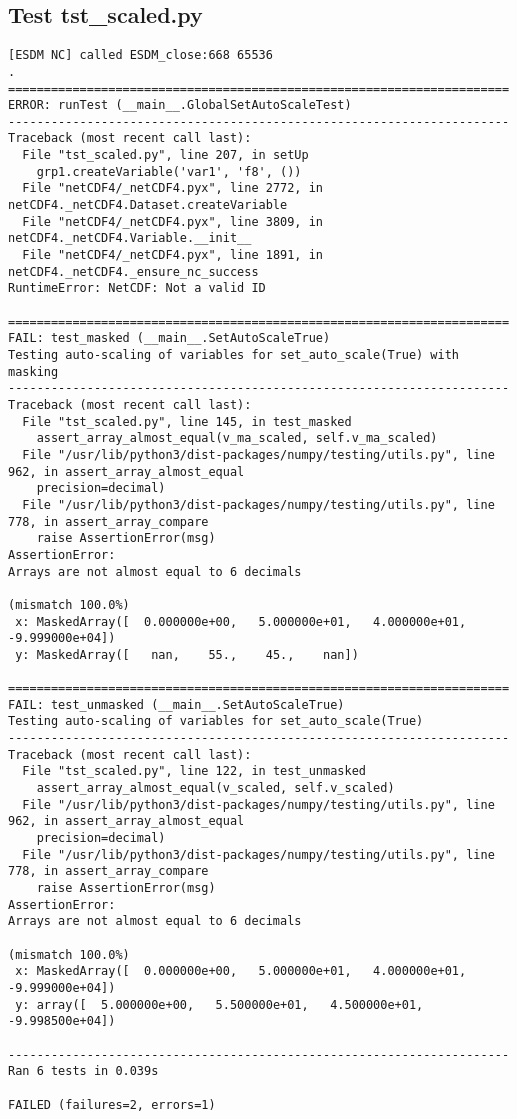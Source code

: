 \subsection{Test tst\_scaled.py}

\begin{verbatim}
[ESDM NC] called ESDM_close:668 65536
.
======================================================================
ERROR: runTest (__main__.GlobalSetAutoScaleTest)
----------------------------------------------------------------------
Traceback (most recent call last):
  File "tst_scaled.py", line 207, in setUp
    grp1.createVariable('var1', 'f8', ())
  File "netCDF4/_netCDF4.pyx", line 2772, in netCDF4._netCDF4.Dataset.createVariable
  File "netCDF4/_netCDF4.pyx", line 3809, in netCDF4._netCDF4.Variable.__init__
  File "netCDF4/_netCDF4.pyx", line 1891, in netCDF4._netCDF4._ensure_nc_success
RuntimeError: NetCDF: Not a valid ID

======================================================================
FAIL: test_masked (__main__.SetAutoScaleTrue)
Testing auto-scaling of variables for set_auto_scale(True) with masking
----------------------------------------------------------------------
Traceback (most recent call last):
  File "tst_scaled.py", line 145, in test_masked
    assert_array_almost_equal(v_ma_scaled, self.v_ma_scaled)
  File "/usr/lib/python3/dist-packages/numpy/testing/utils.py", line 962, in assert_array_almost_equal
    precision=decimal)
  File "/usr/lib/python3/dist-packages/numpy/testing/utils.py", line 778, in assert_array_compare
    raise AssertionError(msg)
AssertionError:
Arrays are not almost equal to 6 decimals

(mismatch 100.0%)
 x: MaskedArray([  0.000000e+00,   5.000000e+01,   4.000000e+01,  -9.999000e+04])
 y: MaskedArray([   nan,    55.,    45.,    nan])

======================================================================
FAIL: test_unmasked (__main__.SetAutoScaleTrue)
Testing auto-scaling of variables for set_auto_scale(True)
----------------------------------------------------------------------
Traceback (most recent call last):
  File "tst_scaled.py", line 122, in test_unmasked
    assert_array_almost_equal(v_scaled, self.v_scaled)
  File "/usr/lib/python3/dist-packages/numpy/testing/utils.py", line 962, in assert_array_almost_equal
    precision=decimal)
  File "/usr/lib/python3/dist-packages/numpy/testing/utils.py", line 778, in assert_array_compare
    raise AssertionError(msg)
AssertionError:
Arrays are not almost equal to 6 decimals

(mismatch 100.0%)
 x: MaskedArray([  0.000000e+00,   5.000000e+01,   4.000000e+01,  -9.999000e+04])
 y: array([  5.000000e+00,   5.500000e+01,   4.500000e+01,  -9.998500e+04])

----------------------------------------------------------------------
Ran 6 tests in 0.039s

FAILED (failures=2, errors=1)
\end{verbatim}

